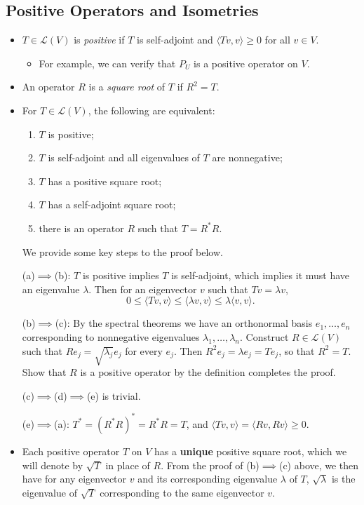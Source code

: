 \documentclass[11pt]{article}
\newcommand{\df}[1]{\textit{\textsf{#1}}}
\newcommand{\inp}[2]{\langle #1, #2 \rangle}
\newcommand{\LV}{\mathcal{L}(V)}
\begin{document}
\subsection{Positive Operators and Isometries}
\begin{itemize}
    \item $T \in \LV$ is \df{positive} if $T$ is self-adjoint and $\inp{Tv}{v} \geq 0$ for all $v \in V$.
    \begin{itemize}
        \item For example, we can verify that $P_U$ is a positive operator on $V$.
    \end{itemize}
    \item An operator $R$ is a \df{square root} of $T$ if $R^2 = T$.
    \item For $T \in \LV$, the following are equivalent:
    \begin{enumerate}[label=(\alph*)]
        \item $T$ is positive;
        \item $T$ is self-adjoint and all eigenvalues of $T$ are nonnegative;
        \item $T$ has a positive square root;
        \item $T$ has a self-adjoint square root;
        \item there is an operator $R$ such that $T = R^* R$.
    \end{enumerate}
    We provide some key steps to the proof below.
    
    (a)$\implies$(b): $T$ is positive implies $T$ is self-adjoint, which implies it must have an eigenvalue $\lambda$. Then for an eigenvector $v$ such that $Tv = \lambda v$, $$0 \leq \inp{Tv}{v} \leq \inp{\lambda v}{v} \leq \lambda\inp{v}{v}.$$
    
    (b)$\implies$(c): By the spectral theorems we have an orthonormal basis $e_1,\dots,e_n$ corresponding to nonnegative eigenvalues $\lambda_1,\dots,\lambda_n$. Construct $R \in \LV$ such that $Re_j = \sqrt{\lambda_j} e_j$ for every $e_j$. Then $R^2e_j = \lambda e_j = Te_j$, so that $R^2 = T$. Show that $R$ is a positive operator by the definition completes the proof.
    
    (c)$\implies$(d)$\implies$(e) is trivial.
    
    (e)$\implies$(a): $T^* = (R^*R)^* = R^*R = T$, and $\inp{Tv}{v}=\inp{Rv}{Rv} \geq 0$.
    
    \item Each positive operator $T$ on $V$ has a \textbf{unique} positive square root, which we will denote by $\sqrt{T}$ in place of $R$. From the proof of (b)$\implies$(c) above, we then have for any eigenvector $v$ and its corresponding eigenvalue $\lambda$ of $T$, $\sqrt{\lambda}$ is the eigenvalue of $\sqrt{T}$ corresponding to the same eigenvector $v$.
    

\end{itemize}
\end{document}
